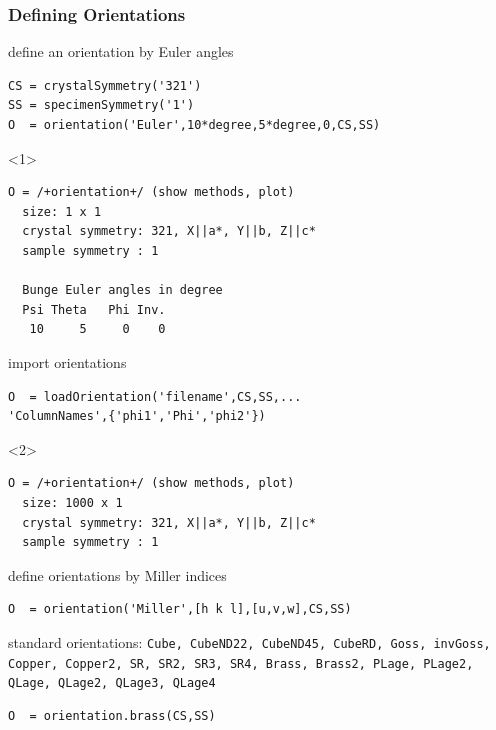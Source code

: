 \documentclass[compress]{beamer}
\begin{document}
\begin{frame}[fragile]
  \frametitle{Defining Orientations}

    \begin{overlayarea}{\textwidth}{8cm}
      define an orientation by Euler angles
  \begin{lstlisting}[style=input]
CS = crystalSymmetry('321')
SS = specimenSymmetry('1')
O  = orientation('Euler',10*degree,5*degree,0,CS,SS)
  \end{lstlisting}
  \begin{onlyenv}<1>
    \vspace{-.3cm}
  \begin{lstlisting}[style=output]
O = /+orientation+/ (show methods, plot)
  size: 1 x 1
  crystal symmetry: 321, X||a*, Y||b, Z||c*
  sample symmetry : 1

  Bunge Euler angles in degree
  Psi Theta   Phi Inv.
   10     5     0    0
  \end{lstlisting}
  \end{onlyenv}

  \pause
  import orientations
  \begin{lstlisting}[style=input]
O  = loadOrientation('filename',CS,SS,...
'ColumnNames',{'phi1','Phi','phi2'})
  \end{lstlisting}
  \begin{onlyenv}<2>
    \vspace{-.3cm}
  \begin{lstlisting}[style=output]
O = /+orientation+/ (show methods, plot)
  size: 1000 x 1
  crystal symmetry: 321, X||a*, Y||b, Z||c*
  sample symmetry : 1
  \end{lstlisting}
  \end{onlyenv}

\pause

define orientations by Miller indices
   \begin{lstlisting}[style=input]
O  = orientation('Miller',[h k l],[u,v,w],CS,SS)
  \end{lstlisting}

\pause

standard orientations: \texttt{Cube, CubeND22, CubeND45, CubeRD, Goss,
invGoss, Copper, Copper2, SR, SR2, SR3, SR4, Brass, Brass2, PLage, PLage2,
QLage, QLage2, QLage3, QLage4}

\begin{lstlisting}[style=input]
O  = orientation.brass(CS,SS)
\end{lstlisting}
\end{overlayarea}
\end{frame}
\end{document}
